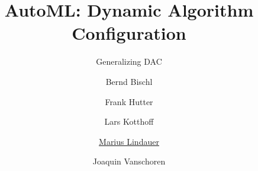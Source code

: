 




\title[AutoML: PBT]{AutoML: Dynamic Algorithm Configuration}
\subtitle{Generalizing DAC}
\author[Marius Lindauer]{Bernd Bischl \and Frank Hutter \and Lars Kotthoff\newline \and \underline{Marius Lindauer} \and Joaquin Vanschoren}
\institute{}
\date{}





	
	\maketitle
	
